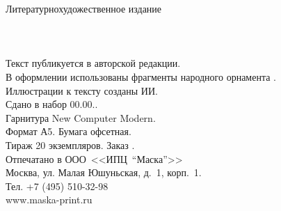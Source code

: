 {
\newpage
\thispagestyle{empty}
\begin{center}
{\small Литературно\sdash художественное издание}\\
\vspace{1.6cm}
{\Large \MyVarAuthorName}\\
\vspace{1.6cm}
{\Large\textbf\MyVarBookName}\\
\vspace{0.4cm}
{\large\textbf\MyVarBookNamesec}\\
\vspace{1.0cm}
{\small%
Текст публикуется в авторской редакции.\\
\vspace{1.0cm}
В оформлении использованы фрагменты народного орнамента \cite{КарельскаяВышивка,Королькова}.\\
Иллюстрации к тексту созданы ИИ.\\
\vspace{1.5cm}
Сдано в набор 00.00.\year.\\
Гарнитура New Computer Modern.\\
Формат А5. Бумага офсетная.\\
Тираж 20 экземпляров. Заказ .\\
\vspace{1.0cm}
Отпечатано в ООО~<<ИПЦ~"`Маска"'>>\\
Москва, ул. Малая Юшуньская, д.~1, корп.~1.\\
Тел. +7 (495) 510-32-98\\
www.maska-print.ru
}
\end{center}
}